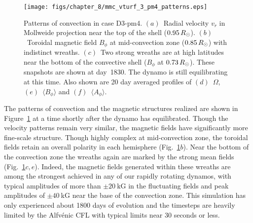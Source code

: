 \begin{figure}[!p]
  \begin{center}
    \texttt{[image: figs/chapter\_8/mmc\_vturf\_3\_pm4\_patterns.eps]}
  \end{center}
  \caption[Patterns of convection in case D3-pm4]
	  {Patterns of convection in case D3-pm4.  
  $(a)$~Radial velocity $v_r$ in Mollweide projection
  near the top of the shell ($0.95\thinspace R_\odot$).  
  $(b)$~Toroidal magnetic field $B_\phi$ at mid-convection zone
  ($0.85\thinspace R_\odot$) with indistinct wreaths.
  $(c)$~Two strong wreaths are at high latitudes near the bottom of the
  convective shell ($B_\phi$ at $0.73\thinspace R_\odot$).
  These snapshots are shown at day~1830.  The dynamo is still
  equilibrating at this time.
  Also shown are 20 day averaged profiles of $(d)$~$\Omega$, 
  $(e)$~$\langle B_\phi \rangle$ and
  $(f)$~$\langle A_\phi \rangle$.
  \label{fig:D3 pm4 convection}}
\end{figure}




The patterns of convection and the magnetic
structures realized are shown in Figure~\ref{fig:D3 pm4 convection} at
a time shortly after the dynamo has equilibrated.  Though the velocity
patterns remain very similar, the magnetic fields have significantly
more fine-scale structure.
Though highly complex at mid-convection zone, the toroidal fields
retain an overall polarity in each hemisphere
(Fig.~\ref{fig:D3 pm4 convection}$b$).  Near the bottom of the
convection zone the wreaths again are marked by the strong mean
fields (Fig.~\ref{fig:D3 pm4 convection}$c,e$).  Indeed, the magnetic
fields generated within these wreaths are among the strongest
achieved in any of our rapidly rotating dynamos, with typical
amplitudes of more than $\pm20\:$kG in the fluctuating fields and peak
amplitudes of $\pm40\:$kG near the base of the convection zone.  This simulation has
only experienced about 1800 days of evolution and the timesteps are
heavily limited by the Alfv\'enic CFL with typical limits near 30
seconds or less.


